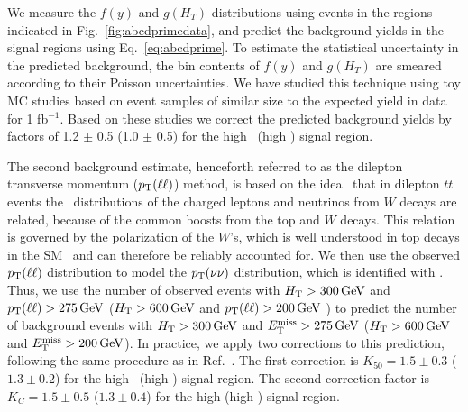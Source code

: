 We measure the $f(y)$ and $g(H_T)$ distributions using events in the regions indicated in Fig.~\ref{fig:abcdprimedata},
and predict the background yields in the signal regions using Eq.~\ref{eq:abcdprime}.
To estimate the statistical uncertainty in the predicted background,  the bin contents
of $f(y)$ and $g(H_T)$ are smeared according to their Poisson uncertainties. 
We have studied this technique using toy MC studies based on
event samples of similar size to the expected yield in data for 1 fb$^{-1}$.
Based on these studies we correct the predicted background yields by factors of 1.2 $\pm$ 0.5
(1.0 $\pm$ 0.5) for the high \MET\ (high \Ht) signal region.


The second  background estimate, henceforth referred to as the dilepton transverse momentum ($p_{\mathrm{T}}(\ell\ell)$) method, 
is  based on the  idea~\cite{ref:victory} that  in dilepton  $t\bar{t}$  events the
\pt\  distributions of  the charged  leptons and  neutrinos  from $W$
decays are  related, because of the  common boosts from  the top  and $W$
decays.  This relation  is governed by the polarization  of the $W$'s,
which         is         well         understood        in         top
decays in the SM~\cite{Wpolarization,Wpolarization2}   and   can  therefore   be
reliably  accounted   for.   We then  use   the  observed
$p_{\mathrm{T}}(\ell\ell)$ distribution to  model the $p_{\mathrm{T}}(\nu\nu)$ distribution,
which is  identified with \MET.  Thus,  we use the  number of observed
events  with $H_{\mathrm{T}} > 300\,\text{Ge\hspace{-.08em}V}$ and $p_{\mathrm{T}}(\ell\ell)  > 275\,\text{Ge\hspace{-.08em}V}$ 
($H_{\mathrm{T}} > 600\,\text{Ge\hspace{-.08em}V}$ and $p_{\mathrm{T}}(\ell\ell)  > 200\,\text{Ge\hspace{-.08em}V}$ )
to predict the  number of  background events  with 
$H_{\mathrm{T}} >  300\,\text{Ge\hspace{-.08em}V}$ and  $E_{\mathrm{T}}^{\text{miss}} > 275\,\text{Ge\hspace{-.08em}V}$ ($H_{\mathrm{T}} >  600\,\text{Ge\hspace{-.08em}V}$ and  $E_{\mathrm{T}}^{\text{miss}} > 200\,\text{Ge\hspace{-.08em}V}$).  
In  practice, we apply two corrections to this prediction, following the same procedure as in Ref.~\cite{ref:ospaper}.
The first correction is $K_{50}=1.5 \pm 0.3$ ($1.3 \pm 0.2$) for the high \MET\ (high \Ht) signal region.
The  second correction factor  is $K_C  = 1.5  \pm 0.5$ ($1.3 \pm 0.4$) for the
high \MET (high \Ht) signal region.

